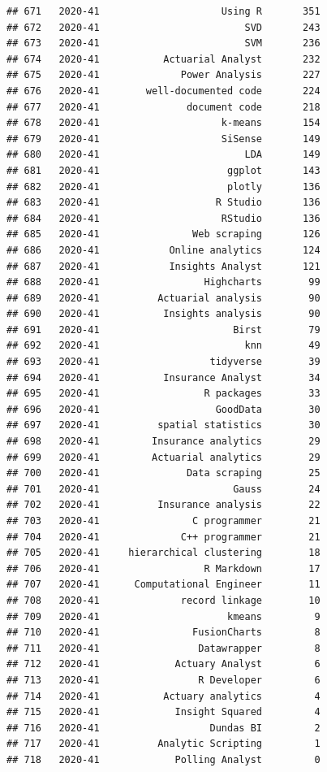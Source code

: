 \documentclass[
]{article}
\begin{document}
\begin{verbatim}
## 671   2020-41                     Using R       351
## 672   2020-41                         SVD       243
## 673   2020-41                         SVM       236
## 674   2020-41           Actuarial Analyst       232
## 675   2020-41              Power Analysis       227
## 676   2020-41        well-documented code       224
## 677   2020-41               document code       218
## 678   2020-41                     k-means       154
## 679   2020-41                     SiSense       149
## 680   2020-41                         LDA       149
## 681   2020-41                      ggplot       143
## 682   2020-41                      plotly       136
## 683   2020-41                    R Studio       136
## 684   2020-41                     RStudio       136
## 685   2020-41                Web scraping       126
## 686   2020-41            Online analytics       124
## 687   2020-41            Insights Analyst       121
## 688   2020-41                  Highcharts        99
## 689   2020-41          Actuarial analysis        90
## 690   2020-41           Insights analysis        90
## 691   2020-41                       Birst        79
## 692   2020-41                         knn        49
## 693   2020-41                   tidyverse        39
## 694   2020-41           Insurance Analyst        34
## 695   2020-41                  R packages        33
## 696   2020-41                    GoodData        30
## 697   2020-41          spatial statistics        30
## 698   2020-41         Insurance analytics        29
## 699   2020-41         Actuarial analytics        29
## 700   2020-41               Data scraping        25
## 701   2020-41                       Gauss        24
## 702   2020-41          Insurance analysis        22
## 703   2020-41                C programmer        21
## 704   2020-41              C++ programmer        21
## 705   2020-41     hierarchical clustering        18
## 706   2020-41                  R Markdown        17
## 707   2020-41      Computational Engineer        11
## 708   2020-41              record linkage        10
## 709   2020-41                      kmeans         9
## 710   2020-41                FusionCharts         8
## 711   2020-41                 Datawrapper         8
## 712   2020-41             Actuary Analyst         6
## 713   2020-41                 R Developer         6
## 714   2020-41           Actuary analytics         4
## 715   2020-41             Insight Squared         4
## 716   2020-41                   Dundas BI         2
## 717   2020-41          Analytic Scripting         1
## 718   2020-41             Polling Analyst         0

\end{verbatim}
\end{document}
